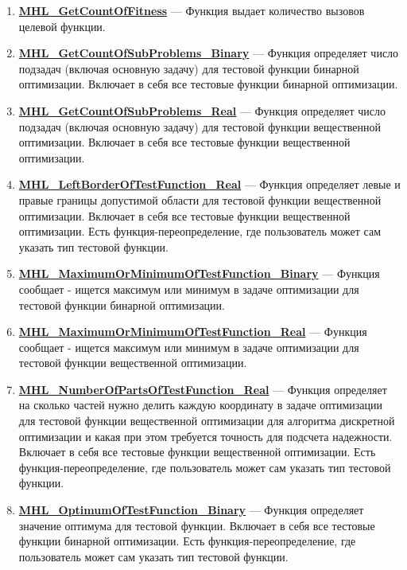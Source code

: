 \documentclass[a4paper,12pt]{article}
\begin{document}
\begin{enumerate}
\item \textbf{\hyperref[MHL_GetCountOfFitness]{MHL\_GetCountOfFitness}} --- Функция выдает количество вызовов целевой функции.

\item \textbf{\hyperref[MHL_GetCountOfSubProblems_Binary]{MHL\_GetCountOfSubProblems\_Binary}} --- Функция определяет число подзадач (включая основную задачу) для тестовой функции бинарной оптимизации. Включает в себя все тестовые функции бинарной оптимизации.

\item \textbf{\hyperref[MHL_GetCountOfSubProblems_Real]{MHL\_GetCountOfSubProblems\_Real}} --- Функция определяет число подзадач (включая основную задачу) для тестовой функции вещественной оптимизации. Включает в себя все тестовые функции вещественной оптимизации.

\item \textbf{\hyperref[MHL_LeftBorderOfTestFunction_Real]{MHL\_LeftBorderOfTestFunction\_Real}} --- Функция определяет левые и правые границы допустимой области для тестовой функции вещественной оптимизации. Включает в себя все тестовые функции вещественной оптимизации. Есть функция-переопределение, где пользователь может сам указать тип тестовой функции.

\item \textbf{\hyperref[MHL_MaximumOrMinimumOfTestFunction_Binary]{MHL\_MaximumOrMinimumOfTestFunction\_Binary}} --- 	Функция сообщает - ищется максимум или минимум в задаче оптимизации для тестовой функции бинарной оптимизации.

\item \textbf{\hyperref[MHL_MaximumOrMinimumOfTestFunction_Real]{MHL\_MaximumOrMinimumOfTestFunction\_Real}} --- 	Функция сообщает - ищется максимум или минимум в задаче оптимизации для тестовой функции вещественной оптимизации.

\item \textbf{\hyperref[MHL_NumberOfPartsOfTestFunction_Real]{MHL\_NumberOfPartsOfTestFunction\_Real}} --- Функция определяет на сколько частей нужно делить каждую координату в задаче оптимизации для тестовой функции вещественной оптимизации для алгоритма дискретной оптимизации и какая при этом требуется точность для подсчета надежности. Включает в себя все тестовые функции вещественной оптимизации. Есть функция-переопределение, где пользователь может сам указать тип тестовой функции.

\item \textbf{\hyperref[MHL_OptimumOfTestFunction_Binary]{MHL\_OptimumOfTestFunction\_Binary}} --- Функция определяет значение оптимума для тестовой функции. Включает в себя все тестовые функции бинарной оптимизации. Есть функция-переопределение, где пользователь может сам указать тип тестовой функции.


\end{enumerate}
\end{document}
